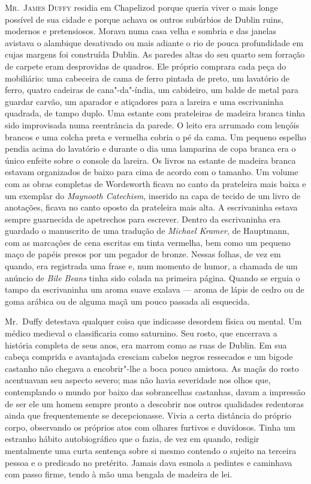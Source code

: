 \textsc{Mr.~James Duffy} residia em Chapelizod porque queria viver o mais longe
possível de sua cidade e porque achava os outros subúrbios de Dublin ruins,
modernos e pretensiosos.  Morava numa casa velha e sombria e das janelas
avistava o alambique desativado ou mais adiante o rio de pouca profundidade em
cujas margens foi construída Dublin.  As paredes altas do seu quarto sem
forração de carpete eram desprovidas de quadros.  Ele próprio comprara cada
peça do mobiliário: uma cabeceira de cama de ferro pintada de preto, um
lavatório de ferro, quatro cadeiras de cana"-da"-índia, um cabideiro, um balde de
metal para guardar carvão, um aparador e atiçadores para a lareira e uma
escrivaninha quadrada, de tampo duplo.  Uma estante com prateleiras de madeira
branca tinha sido improvisada numa reentrância da parede.  O leito era arrumado
com lençóis brancos e uma colcha preta e vermelha cobria o pé da cama.  Um
pequeno espelho pendia acima do lavatório e durante o dia uma lamparina de copa
branca era o único enfeite sobre o console da lareira.  Os livros na estante de
madeira branca estavam organizados de baixo para cima de acordo com o tamanho.
Um volume com as obras completas de Wordsworth ficava no canto da prateleira
mais baixa e um exemplar do \textit{Maynooth Catechism}, inserido na capa de
tecido de um livro de anotações, ficava no canto oposto da prateleira mais
alta.  A escrivaninha estava sempre guarnecida de apetrechos para escrever.
Dentro da escrivaninha era guardado o manuscrito de uma tradução de
\textit{Michael Kramer}, de Hauptmann, com as marcações de cena escritas em
tinta vermelha, bem como um pequeno maço de papéis presos por um pegador de
bronze.  Nessas folhas, de vez em quando, era registrada uma frase e, num
momento de humor, a chamada de um anúncio de \textit{Bile Beans} tinha sido
colada na primeira página.  Quando se erguia o tampo da escrivaninha um aroma
suave exalava --- aroma de lápis de cedro ou de goma arábica ou de alguma
maçã um pouco passada ali esquecida.

Mr.~Duffy detestava qualquer coisa que indicasse desordem física ou mental.  Um
médico medieval o classificaria como saturnino.  Seu rosto, que encerrava a
história completa de seus anos, era marrom como as ruas de Dublin.  Em sua
cabeça comprida e avantajada cresciam cabelos negros ressecados e um bigode
castanho não chegava a encobrir"-lhe a boca pouco amistosa.  As maçãs do rosto
acentuavam seu aspecto severo; mas não havia severidade nos olhos que,
contemplando o mundo por baixo das sobrancelhas castanhas, davam a impressão de
ser ele um homem sempre pronto a descobrir nos outros qualidades redentoras
ainda que frequentemente se decepcionasse.  Vivia a certa distância do próprio
corpo, observando os próprios atos com olhares furtivos e duvidosos.  Tinha um
estranho hábito autobiográfico que o fazia, de vez em quando, redigir
mentalmente uma curta sentença sobre si mesmo contendo o sujeito na terceira
pessoa e o predicado no pretérito.  Jamais dava esmola a pedintes e caminhava
com passo firme, tendo à mão uma bengala de madeira de lei.

